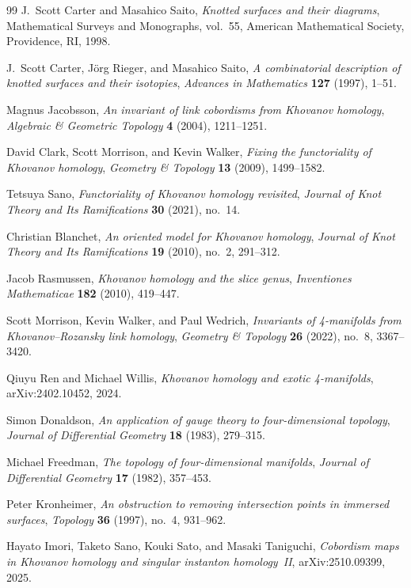 \documentclass[12pt, a4paper]{article}
\theoremstyle{plain}
\theoremstyle{definition}
\theoremstyle{correspondence}
\begin{document}
\begin{thebibliography}{99}
J.~Scott Carter and Masahico Saito,
\textit{Knotted surfaces and their diagrams},
Mathematical Surveys and Monographs, vol.~55,
American Mathematical Society, Providence, RI, 1998.

J.~Scott Carter, J{\"o}rg Rieger, and Masahico Saito,
\textit{A combinatorial description of knotted surfaces and their isotopies},
\textit{Advances in Mathematics} \textbf{127} (1997), 1--51.

Magnus Jacobsson,
\textit{An invariant of link cobordisms from Khovanov homology},
\textit{Algebraic \& Geometric Topology} \textbf{4} (2004), 1211--1251.

David Clark, Scott Morrison, and Kevin Walker,
\textit{Fixing the functoriality of Khovanov homology},
\textit{Geometry \& Topology} \textbf{13} (2009), 1499--1582.

Tetsuya Sano,
\textit{Functoriality of Khovanov homology revisited},
\textit{Journal of Knot Theory and Its Ramifications} \textbf{30} (2021), no.~14.

Christian Blanchet,
\textit{An oriented model for Khovanov homology},
\textit{Journal of Knot Theory and Its Ramifications} \textbf{19} (2010), no.~2, 291--312.

Jacob Rasmussen,
\textit{Khovanov homology and the slice genus},
\textit{Inventiones Mathematicae} \textbf{182} (2010), 419--447.

Scott Morrison, Kevin Walker, and Paul Wedrich,
\textit{Invariants of 4-manifolds from Khovanov--Rozansky link homology},
\textit{Geometry \& Topology} \textbf{26} (2022), no.~8, 3367--3420.

Qiuyu Ren and Michael Willis,
\textit{Khovanov homology and exotic 4-manifolds},
arXiv:2402.10452, 2024.

Simon Donaldson,
\textit{An application of gauge theory to four-dimensional topology},
\textit{Journal of Differential Geometry} \textbf{18} (1983), 279--315.

Michael Freedman,
\textit{The topology of four-dimensional manifolds},
\textit{Journal of Differential Geometry} \textbf{17} (1982), 357--453.

Peter Kronheimer,
\textit{An obstruction to removing intersection points in immersed surfaces},
\textit{Topology} \textbf{36} (1997), no.~4, 931--962.

Hayato Imori, Taketo Sano, Kouki Sato, and Masaki Taniguchi,
\textit{Cobordism maps in Khovanov homology and singular instanton homology~II},
arXiv:2510.09399, 2025.


\end{thebibliography}
\end{document}
